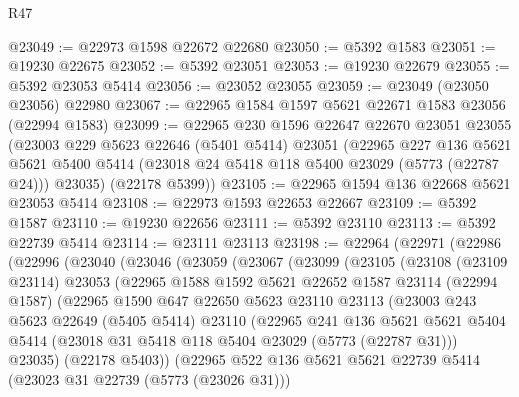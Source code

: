 \begin{lexlean}{R47}
\begin{coremodule}
@23049 := @22973 @1598 @22672 @22680
@23050 := @5392 @1583
@23051 := @19230 @22675
@23052 := @5392 @23051
@23053 := @19230 @22679
@23055 := @5392 @23053 @5414
@23056 := @23052 @23055
@23059 := @23049 (@23050 @23056) @22980
@23067 := @22965 @1584 @1597 @5621 @22671 @1583 @23056 (@22994 @1583)
@23099 := @22965
    @230
    @1596
    @22647
    @22670
    @23051
    @23055
    (@23003
      @229
      @5623
      @22646
      (@5401 @5414)
      @23051
      (@22965
        @227
        @136
        @5621
        @5621
        @5400
        @5414
        (@23018 @24 @5418 @118 @5400 @23029 (@5773 (@22787 @24)))
        @23035)
      (@22178 @5399))
@23105 := @22965 @1594 @136 @22668 @5621 @23053 @5414
@23108 := @22973 @1593 @22653 @22667
@23109 := @5392 @1587
@23110 := @19230 @22656
@23111 := @5392 @23110
@23113 := @5392 @22739 @5414
@23114 := @23111 @23113
@23198 := @22964
    (@22971
      (@22986
        (@22996
          (@23040
            (@23046
              (@23059
                (@23067
                  (@23099
                    (@23105
                      (@23108
                        (@23109 @23114)
                        @23053
                        (@22965
                          @1588
                          @1592
                          @5621
                          @22652
                          @1587
                          @23114
                          (@22994 @1587)
                          (@22965
                            @1590
                            @647
                            @22650
                            @5623
                            @23110
                            @23113
                            (@23003
                              @243
                              @5623
                              @22649
                              (@5405 @5414)
                              @23110
                              (@22965
                                @241
                                @136
                                @5621
                                @5621
                                @5404
                                @5414
                                (@23018 @31 @5418 @118 @5404 @23029 (@5773 (@22787 @31)))
                                @23035)
                              (@22178 @5403))
                            (@22965
                              @522
                              @136
                              @5621
                              @5621
                              @22739
                              @5414
                              (@23023 @31 @22739 (@5773 (@23026 @31)))

\end{coremodule}
\end{lexlean}

